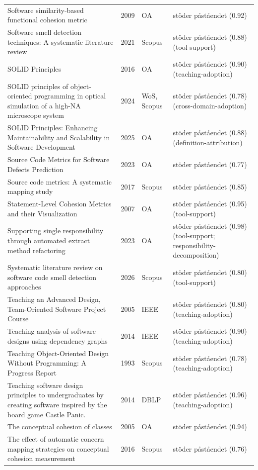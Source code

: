 \begin{longtable}{@{}%
  >{\raggedright\arraybackslash}p{}c%
  >{\raggedright\arraybackslash}p{}%
  >{\raggedright\arraybackslash}p{}@{}}
Software similarity-based functional cohesion metric & 2009 & OA & stöder påståendet (0.92) \\
Software smell detection techniques: A systematic literature review & 2021 & Scopus & stöder påståendet (0.88) (tool-support) \\
SOLID Principles & 2016 & OA & stöder påståendet (0.90) (teaching-adoption) \\
SOLID principles of object-oriented programming in optical simulation of a high-NA microscope system & 2024 & WoS, Scopus & stöder påståendet (0.78) (cross-domain-adoption) \\
SOLID Principles: Enhancing Maintainability and Scalability in Software Development & 2025 & OA & stöder påståendet (0.88) (definition-attribution) \\
Source Code Metrics for Software Defects Prediction & 2023 & OA & stöder påståendet (0.77) \\
Source code metrics: A systematic mapping study & 2017 & Scopus & stöder påståendet (0.85) \\
Statement-Level Cohesion Metrics and their Visualization & 2007 & OA & stöder påståendet (0.95) (tool-support) \\
Supporting single responsibility through automated extract method refactoring & 2023 & OA & stöder påståendet (0.98) (tool-support; responsibility-decomposition) \\
Systematic literature review on software code smell detection approaches & 2026 & Scopus & stöder påståendet (0.80) (tool-support) \\
Teaching an Advanced Design, Team-Oriented Software Project Course & 2005 & IEEE & stöder påståendet (0.80) (teaching-adoption) \\
Teaching analysis of software designs using dependency graphs & 2014 & IEEE & stöder påståendet (0.90) (teaching-adoption) \\
Teaching Object-Oriented Design Without Programming: A Progress Report & 1993 & Scopus & stöder påståendet (0.78) (teaching-adoption) \\
Teaching software design principles to undergraduates by creating software inspired by the board game Castle Panic. & 2014 & DBLP & stöder påståendet (0.96) (teaching-adoption) \\
The conceptual cohesion of classes & 2005 & OA & stöder påståendet (0.94) \\
The effect of automatic concern mapping strategies on conceptual cohesion measurement & 2016 & Scopus & stöder påståendet (0.76) \\

\end{longtable}
